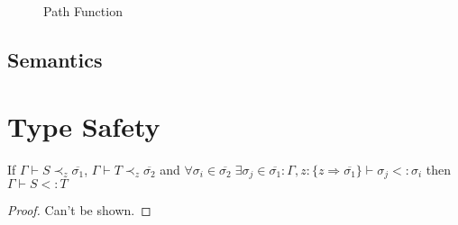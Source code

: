 \documentclass{llncs}
\begin{document}
\begin{figure}[h]
\caption{Path Function}
\label{f:path}
\end{figure}

\subsection{Semantics}













\section{Type Safety}

\begin{lemma}\label{lem:sub}
If $\Gamma \vdash S \prec_z \overline{\sigma_1}$,
	$\Gamma \vdash T \prec_z \overline{\sigma_2}$ and
	$\forall \sigma_i \in \overline{\sigma_2} \;
	 \exists \sigma_j \in \overline{\sigma_1}:
	 \Gamma, z : \{z \Rightarrow \overline{\sigma_1}\} 
	 \vdash \sigma_j <: \sigma_i$ then
	$\Gamma \vdash S <: T$
\end{lemma}
\begin{proof}
Can't be shown.
\end{proof}
\end{document}

